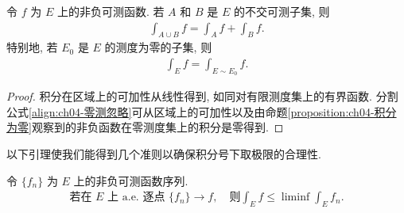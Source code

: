 \documentclass[../../main.tex]{subfiles}
\begin{document}
\begin{theorem}[积分在区域上的可加性]\label{theorem:ch04-区域可加}
令 $f$ 为 $E$ 上的非负可测函数. 若 $A$ 和 $B$ 是 $E$ 的不交可测子集, 则
\begin{align*}
\int_{A\cup B}f=\int_{A}f+\int_{B}f.
\end{align*}
特别地, 若 $E_{0}$ 是 $E$ 的测度为零的子集, 则
\begin{align}
\int_{E}f=\int_{E\sim E_{0}}f.\label{align:ch04-零测忽略}
\end{align}
\end{theorem}

\begin{proof}
积分在区域上的可加性从线性得到, 如同对有限测度集上的有界函数. 分割公式\eqref{align:ch04-零测忽略}可从区域上的可加性以及由命题\cref{proposition:ch04-积分为零}观察到的非负函数在零测度集上的积分是零得到.
\end{proof}

以下引理使我们能得到几个准则以确保积分号下取极限的合理性.

\begin{lemma}[Fatou 引理]\label{lemma:ch04-Fatou}
令 $\{f_{n}\}$ 为 $E$ 上的非负可测函数序列.
\begin{align}
\text{若在 }E\text{ 上 a.e. 逐点 }\{f_{n}\}\to f,\quad\text{则}\int_{E}f\leqslant\liminf\int_{E}f_{n}.\label{align:ch04-Fatou}
\end{align}
\end{lemma}
\end{document}
